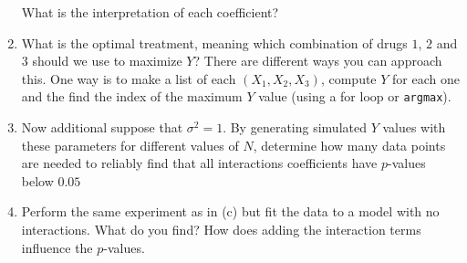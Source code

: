 \begin{exercise}
\begin{enumerate}[label=(\alph*)]
What is the interpretation of each coefficient? 
\item 
What is the optimal treatment, meaning which combination of drugs $1$, $2$ and $3$ should we use to maximize $Y$? There are different ways you can approach this. One way is to make a list of each $(X_1,X_2,X_3)$, compute $Y$ for each one and the find the index of the maximum $Y$ value (using a for loop or \verb!argmax!). 
\item Now additional suppose that $\sigma^2 = 1$. 
By generating simulated $Y$ values with these parameters for different values of $N$, determine how many data points are needed to reliably find that all interactions coefficients have $p$-values below $0.05$
\item Perform the same experiment as in (c) but fit the data to a model with no interactions. What do you find? How does adding the interaction terms influence the $p$-values. 
\end{enumerate}
\end{exercise}








 






